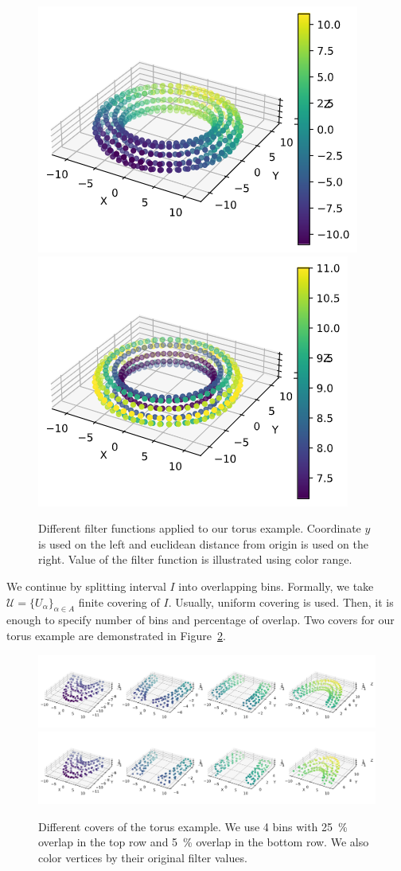 \documentclass{article}
\begin{document}
\begin{figure}[ht]
    \centering
    \includegraphics[width=0.35\columnwidth]{torus-y-coor}
    \includegraphics[width=0.35\columnwidth]{torus-distance-from-origin}
    \caption{Different filter functions applied to our torus example.
        Coordinate $y$ is used on the left and euclidean distance from origin is used on the right.
        Value of the filter function is illustrated using color range.}
    \label{fig:torus-filter}
\end{figure}

We continue by splitting interval $I$ into overlapping bins.
Formally, we take $\mathcal{U} = \{ U_\alpha \}_{\alpha \in A}$ finite covering of $I$.
Usually, uniform covering is used.
Then, it is enough to specify number of bins and percentage of overlap.
Two covers for our torus example are demonstrated in Figure~\ref{fig:torus-cover}.

\begin{figure}[ht]
    \centering
    \includegraphics[width=0.9\columnwidth]{torus-partition-4-25}
    \includegraphics[width=0.9\columnwidth]{torus-partition-4-05}
    \caption{Different covers of the torus example.
        We use 4 bins with 25~\% overlap in the top row and 5~\% overlap in the bottom row.
        We also color vertices by their original filter values.}
    \label{fig:torus-cover}
\end{figure}
\end{document}

